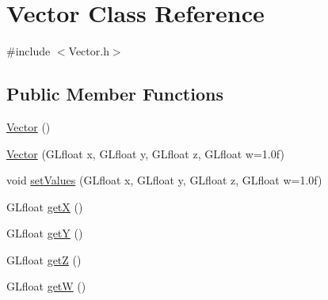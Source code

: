 \hypertarget{class_vector}{
\section{\-Vector \-Class \-Reference}
\label{class_vector}
}


{\ttfamily \#include $<$\-Vector.\-h$>$}

\subsection*{\-Public \-Member \-Functions}
\begin{DoxyCompactItemize}
\item 
\hyperlink{class_vector_a6f80c73b5f18dcf3f8e36065bdc8b9e5}{\-Vector} ()
\item 
\hyperlink{class_vector_af5311e0ef5b13bd7643355bafd9f023f}{\-Vector} (\-G\-Lfloat x, \-G\-Lfloat y, \-G\-Lfloat z, \-G\-Lfloat w=1.\-0f)
\item 
void \hyperlink{class_vector_ab1fd44956712ca844838dcf6ce76dadb}{set\-Values} (\-G\-Lfloat x, \-G\-Lfloat y, \-G\-Lfloat z, \-G\-Lfloat w=1.\-0f)
\item 
\-G\-Lfloat \hyperlink{class_vector_a520f954e0bf0cfd2ac3ba7fd9ef87b26}{get\-X} ()
\item 
\-G\-Lfloat \hyperlink{class_vector_abdc63d8dc8da39532addd27cd31ffde4}{get\-Y} ()
\item 
\-G\-Lfloat \hyperlink{class_vector_a3a5653a55fbf04c8a89daf163d2d7a87}{get\-Z} ()
\item 
\-G\-Lfloat \hyperlink{class_vector_a3653affbf6ee4f98e37b9373b11cfcd9}{get\-W} ()
\end{DoxyCompactItemize}


